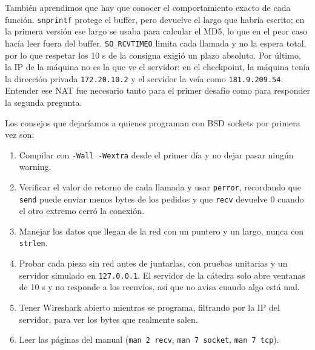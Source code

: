 \documentclass[11pt,a4paper]{article}
\newcommand{\code}[1]{\texttt{#1}}
\begin{document}
También aprendimos que hay que conocer el comportamiento exacto de cada función. \code{snprintf} protege el buffer,
pero devuelve el largo que habría escrito; en la primera versión ese largo se usaba para calcular el MD5, lo que en
el peor caso hacía leer fuera del buffer. \code{SO\_RCVTIMEO} limita cada llamada y no la espera total, por lo que
respetar los 10 s de la consigna exigió un plazo absoluto. Por último, la IP de la máquina no es la que ve el
servidor: en el checkpoint, la máquina tenía la dirección privada \code{172.20.10.2} y el servidor la veía como
\code{181.9.209.54}. Entender ese NAT fue necesario tanto para el primer desafío como para responder la segunda
pregunta.

Los consejos que dejaríamos a quienes programan con BSD sockets por primera vez son:
\begin{enumerate}
\item Compilar con \code{-Wall -Wextra} desde el primer día y no dejar pasar ningún warning.
\item Verificar el valor de retorno de cada llamada y usar \code{perror}, recordando que \code{send} puede enviar
  menos bytes de los pedidos y que \code{recv} devuelve 0 cuando el otro extremo cerró la conexión.
\item Manejar los datos que llegan de la red con un puntero y un largo, nunca con \code{strlen}.
\item Probar cada pieza sin red antes de juntarlas, con pruebas unitarias y un servidor simulado en
  \code{127.0.0.1}. El servidor de la cátedra solo abre ventanas de 10 s y no responde a los reenvíos, así que no avisa
  cuando algo está mal.
\item Tener Wireshark abierto mientras se programa, filtrando por la IP del servidor, para ver los bytes que realmente
  salen.
\item Leer las páginas del manual (\code{man 2 recv}, \code{man 7 socket}, \code{man 7 tcp}).
\end{enumerate}
\end{document}
